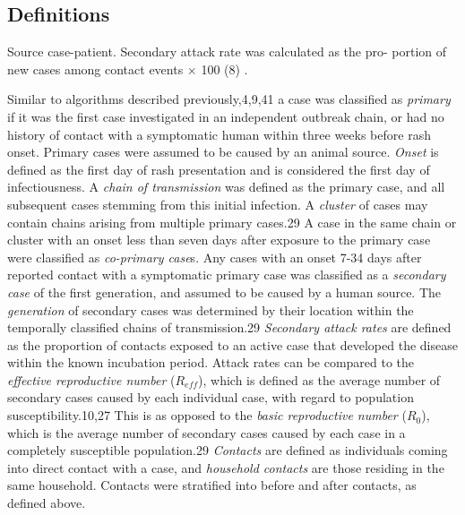 \subsection{Definitions}
Source case-patient. Secondary attack rate was calculated as the pro- portion of new cases among contact events × 100 (8) \cite{Dixon2015}.

Similar to algorithms described previously,4,9,41 a case was classified as \textit{primary} if it was the first case investigated in an independent outbreak chain, or had no history of contact with a symptomatic human within three weeks before rash onset. Primary cases were assumed to be caused by an animal source. \textit{Onset} is defined as the first day of rash presentation and is considered the first day of infectiousness. A \textit{chain of transmission} was defined as the primary case, and all subsequent cases stemming from this initial infection. A \textit{cluster} of cases may contain chains arising from multiple primary cases.29 A case in the same chain or cluster with an onset less than seven days after exposure to the primary case were classified as \textit{co-primary case}s. Any cases with an onset 7-34 days after reported contact with a symptomatic primary case was classified as a \textit{secondary case} of the first generation, and assumed to be caused by a human source. The \textit{generation} of secondary cases was determined by their location within the temporally classified chains of transmission.29
\textit{Secondary attack rates} are defined as the proportion of contacts exposed to an active case that developed the disease within the known incubation period. Attack rates can be compared to the \textit{effective reproductive number} ($R_{eff}$), which is defined as the average number of secondary cases caused by each individual case, with regard to population susceptibility.10,27 This is as opposed to the \textit{basic reproductive number} ($R_{0}$), which is the average number of secondary cases caused by each case in a completely susceptible population.29 \textit{Contacts} are defined as individuals coming into direct contact with a case, and \textit{household contacts} are those residing in the same household. Contacts were stratified into before and after contacts, as defined above. 